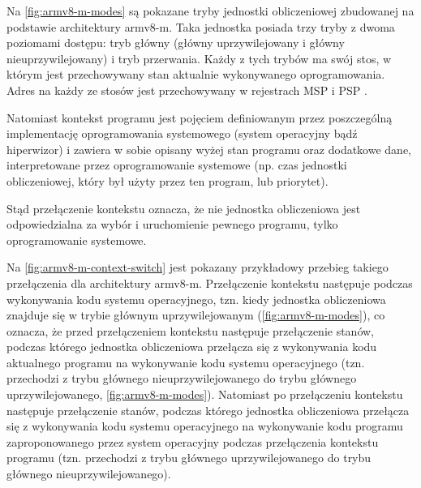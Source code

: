 \documentclass[../main]{subfiles}
\begin{document}
Na \cref{fig:armv8-m-modes} są pokazane tryby jednostki obliczeniowej zbudowanej na podstawie
architektury \acrshort{arm}v8-\acrshort{m}. Taka jednostka posiada trzy tryby z dwoma poziomami
dostępu: tryb główny (główny uprzywilejowany i główny nieuprzywilejowany) i tryb przerwania. Każdy z
tych trybów ma swój stos, w którym jest przechowywany stan aktualnie wykonywanego oprogramowania.
Adres na każdy ze stosów jest przechowywany w rejestrach MSP i PSP \cite{armv8mintro}.

Natomiast kontekst programu jest pojęciem definiowanym przez poszczególną implementację oprogramowania
systemowego (system operacyjny bądź hiperwizor) i zawiera w sobie opisany wyżej stan programu oraz
dodatkowe dane, interpretowane przez oprogramowanie systemowe (np. czas jednostki obliczeniowej, który
był użyty przez ten program, lub priorytet).

Stąd przełączenie kontekstu oznacza, że nie jednostka obliczeniowa jest odpowiedzialna za wybór i
uruchomienie pewnego programu, tylko oprogramowanie systemowe.

Na \cref{fig:armv8-m-context-switch} jest pokazany przykładowy przebieg takiego przełączenia dla
architektury \acrshort{arm}v8-\acrshort{m}. Przełączenie kontekstu następuje podczas wykonywania kodu
systemu operacyjnego, tzn. kiedy jednostka obliczeniowa znajduje się w trybie głównym uprzywilejowanym
(\cref{fig:armv8-m-modes}), co oznacza, że przed przełączeniem kontekstu następuje przełączenie
stanów, podczas którego jednostka obliczeniowa przełącza się z wykonywania kodu aktualnego programu na
wykonywanie kodu systemu operacyjnego (tzn. przechodzi z trybu głównego nieuprzywilejowanego do trybu
głównego uprzywilejowanego, \cref{fig:armv8-m-modes}). Natomiast po przełączeniu kontekstu następuje
przełączenie stanów, podczas którego jednostka obliczeniowa przełącza się z wykonywania kodu systemu
operacyjnego na wykonywanie kodu programu zaproponowanego przez system operacyjny podczas przełączenia
kontekstu programu (tzn. przechodzi z trybu głównego uprzywilejowanego do trybu głównego
nieuprzywilejowanego).
\end{document}

